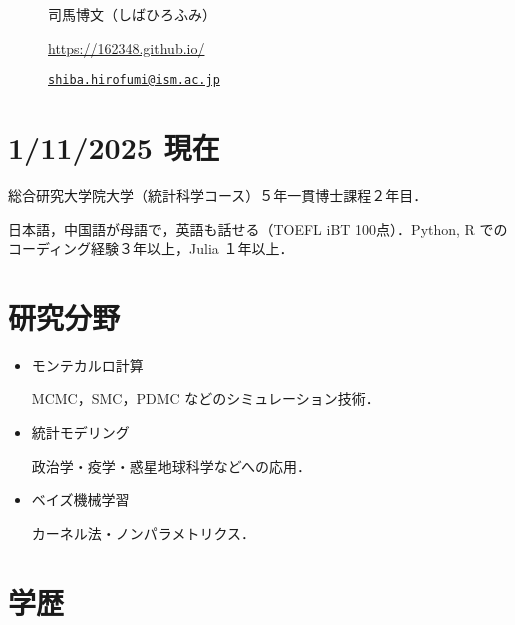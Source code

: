 \documentclass[
  11pt,
]{article}
\author{}
\date{}
\begin{document}
\begin{figure}

\begin{minipage}{0.50\linewidth}

\Huge 司馬博文（しばひろふみ）

\end{minipage}%
%
\begin{minipage}{0.50\linewidth}

\color{minty}

\hfill {} \url{https://162348.github.io/}

\par

\hfill {}
\href{mailto:shiba.hirofumi@ism.ac.jp}{\nolinkurl{shiba.hirofumi@ism.ac.jp}}

\par

\end{minipage}%

\end{figure}%

\vspace{-1em}

\section{1/11/2025 現在}\label{ux73feux5728}

総合研究大学院大学（統計科学コース）５年一貫博士課程２年目．

日本語，中国語が母語で，英語も話せる（TOEFL iBT 100点）．Python, R
でのコーディング経験３年以上，Julia １年以上．

\section{研究分野}\label{ux7814ux7a76ux5206ux91ce}

\begin{itemize}
\item
  モンテカルロ計算

  MCMC，SMC，PDMC などのシミュレーション技術．
\item
  統計モデリング

  政治学・疫学・惑星地球科学などへの応用．
\item
  ベイズ機械学習

  カーネル法・ノンパラメトリクス．
\end{itemize}

\section{学歴}\label{ux5b66ux6b74}
\end{document}

